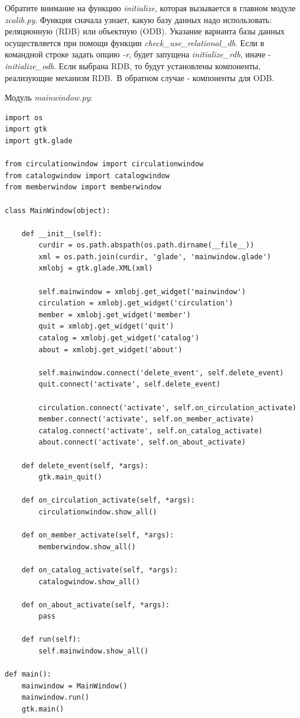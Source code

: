 \documentclass[a4paper,openany,twoside,draft]{book}
\providecommand*{\DUroletitlereference}[1]{\textsl{#1}}
\begin{document}
Обратите внимание на функцию \DUroletitlereference{initialize}, которая вызывается в главном модуле \DUroletitlereference{zcalib.py}.  Функция сначала узнает, какую базу данных надо использовать: реляционную (RDB) или объектную (ODB).  Указание варианта базы данных осуществляется при помощи функции \DUroletitlereference{check\_use\_relational\_db}.  Если в командной строке задать опцию \DUroletitlereference{-r}, будет запущена \DUroletitlereference{initialize\_rdb}, иначе - \DUroletitlereference{initialize\_odb}.  Если выбрана RDB, то будут установлены компоненты, реализующие механизм RDB.~В обратном случае - компоненты для ODB.

Модуль \DUroletitlereference{mainwindow.py}:

\begin{verbatim}
import os
import gtk
import gtk.glade

from circulationwindow import circulationwindow
from catalogwindow import catalogwindow
from memberwindow import memberwindow

class MainWindow(object):

    def __init__(self):
        curdir = os.path.abspath(os.path.dirname(__file__))
        xml = os.path.join(curdir, 'glade', 'mainwindow.glade')
        xmlobj = gtk.glade.XML(xml)

        self.mainwindow = xmlobj.get_widget('mainwindow')
        circulation = xmlobj.get_widget('circulation')
        member = xmlobj.get_widget('member')
        quit = xmlobj.get_widget('quit')
        catalog = xmlobj.get_widget('catalog')
        about = xmlobj.get_widget('about')

        self.mainwindow.connect('delete_event', self.delete_event)
        quit.connect('activate', self.delete_event)

        circulation.connect('activate', self.on_circulation_activate)
        member.connect('activate', self.on_member_activate)
        catalog.connect('activate', self.on_catalog_activate)
        about.connect('activate', self.on_about_activate)

    def delete_event(self, *args):
        gtk.main_quit()

    def on_circulation_activate(self, *args):
        circulationwindow.show_all()

    def on_member_activate(self, *args):
        memberwindow.show_all()

    def on_catalog_activate(self, *args):
        catalogwindow.show_all()

    def on_about_activate(self, *args):
        pass

    def run(self):
        self.mainwindow.show_all()

def main():
    mainwindow = MainWindow()
    mainwindow.run()
    gtk.main()
\end{verbatim}
\end{document}
